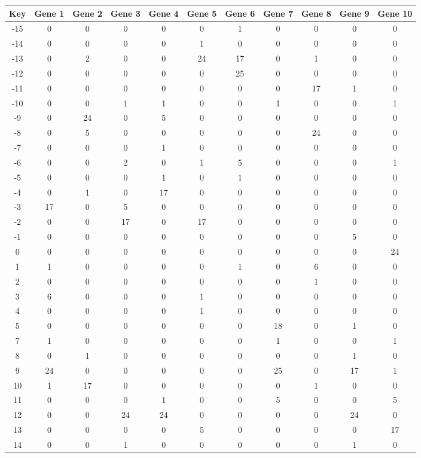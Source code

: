 \begin{tabular}{|c|c|c|c|c|c|c|c|c|c|c|}
\hline
Key & Gene 1 & Gene 2 & Gene 3 & Gene 4 & Gene 5 & Gene 6 & Gene 7 & Gene 8 & Gene 9 & Gene 10 \\
\hline
-15 & 0 & 0 & 0 & 0 & 0 & 1 & 0 & 0 & 0 & 0 \\
-14 & 0 & 0 & 0 & 0 & 1 & 0 & 0 & 0 & 0 & 0 \\
-13 & 0 & 2 & 0 & 0 & 24 & 17 & 0 & 1 & 0 & 0 \\
-12 & 0 & 0 & 0 & 0 & 0 & 25 & 0 & 0 & 0 & 0 \\
-11 & 0 & 0 & 0 & 0 & 0 & 0 & 0 & 17 & 1 & 0 \\
-10 & 0 & 0 & 1 & 1 & 0 & 0 & 1 & 0 & 0 & 1 \\
-9 & 0 & 24 & 0 & 5 & 0 & 0 & 0 & 0 & 0 & 0 \\
-8 & 0 & 5 & 0 & 0 & 0 & 0 & 0 & 24 & 0 & 0 \\
-7 & 0 & 0 & 0 & 1 & 0 & 0 & 0 & 0 & 0 & 0 \\
-6 & 0 & 0 & 2 & 0 & 1 & 5 & 0 & 0 & 0 & 1 \\
-5 & 0 & 0 & 0 & 1 & 0 & 1 & 0 & 0 & 0 & 0 \\
-4 & 0 & 1 & 0 & 17 & 0 & 0 & 0 & 0 & 0 & 0 \\
-3 & 17 & 0 & 5 & 0 & 0 & 0 & 0 & 0 & 0 & 0 \\
-2 & 0 & 0 & 17 & 0 & 17 & 0 & 0 & 0 & 0 & 0 \\
-1 & 0 & 0 & 0 & 0 & 0 & 0 & 0 & 0 & 5 & 0 \\
0 & 0 & 0 & 0 & 0 & 0 & 0 & 0 & 0 & 0 & 24 \\
1 & 1 & 0 & 0 & 0 & 0 & 1 & 0 & 6 & 0 & 0 \\
2 & 0 & 0 & 0 & 0 & 0 & 0 & 0 & 1 & 0 & 0 \\
3 & 6 & 0 & 0 & 0 & 1 & 0 & 0 & 0 & 0 & 0 \\
4 & 0 & 0 & 0 & 0 & 1 & 0 & 0 & 0 & 0 & 0 \\
5 & 0 & 0 & 0 & 0 & 0 & 0 & 18 & 0 & 1 & 0 \\
7 & 1 & 0 & 0 & 0 & 0 & 0 & 1 & 0 & 0 & 1 \\
8 & 0 & 1 & 0 & 0 & 0 & 0 & 0 & 0 & 1 & 0 \\
9 & 24 & 0 & 0 & 0 & 0 & 0 & 25 & 0 & 17 & 1 \\
10 & 1 & 17 & 0 & 0 & 0 & 0 & 0 & 1 & 0 & 0 \\
11 & 0 & 0 & 0 & 1 & 0 & 0 & 5 & 0 & 0 & 5 \\
12 & 0 & 0 & 24 & 24 & 0 & 0 & 0 & 0 & 24 & 0 \\
13 & 0 & 0 & 0 & 0 & 5 & 0 & 0 & 0 & 0 & 17 \\
14 & 0 & 0 & 1 & 0 & 0 & 0 & 0 & 0 & 1 & 0 \\
\hline
\end{tabular}